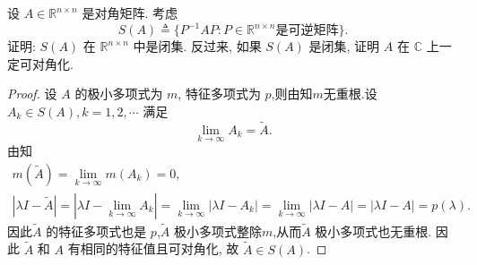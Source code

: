 \documentclass[../../main.tex]{subfiles}%
\begin{document}
\begin{example}
设 \( A \in \mathbb{R}^{n \times n} \) 是对角矩阵. 考虑
\[
S(A) \triangleq \{ P^{-1}AP : P \in \mathbb{R}^{n \times n} \text{是可逆矩阵} \}.
\]
证明: \( S(A) \) 在 \( \mathbb{R}^{n \times n} \) 中是闭集. 反过来, 如果 \( S(A) \) 是闭集, 证明 \( A \) 在 \( \mathbb{C} \) 上一定可对角化.
\end{example}
\begin{proof}
设 \( A \) 的极小多项式为 \( m \), 特征多项式为 \( p \),则由知$m$无重根.设 \( A_k \in S(A), k = 1,2,\cdots \) 满足
\[
\lim_{k \to \infty} A_k = \tilde{A}.
\]
由知
\begin{gather*}
m(\tilde{A})=\lim_{k\rightarrow \infty} m(A_k)=0,
\\
\left| \lambda I-\tilde{A} \right|=\left| \lambda I-\lim_{k\rightarrow \infty} A_k \right|=\lim_{k\rightarrow \infty} \left| \lambda I-A_k \right|=\lim_{k\rightarrow \infty} \left| \lambda I-A \right|=\left| \lambda I-A \right|=p\left( \lambda \right) .
\end{gather*}
因此\( \tilde{A} \) 的特征多项式也是 \( p \),\( \tilde{A} \) 极小多项式整除$m$,从而\( \tilde{A} \) 极小多项式也无重根.  因此 \( \tilde{A} \) 和 \( A \) 有相同的特征值且可对角化, 故 \( \tilde{A} \in S(A) \).


\end{proof}
\end{document}
